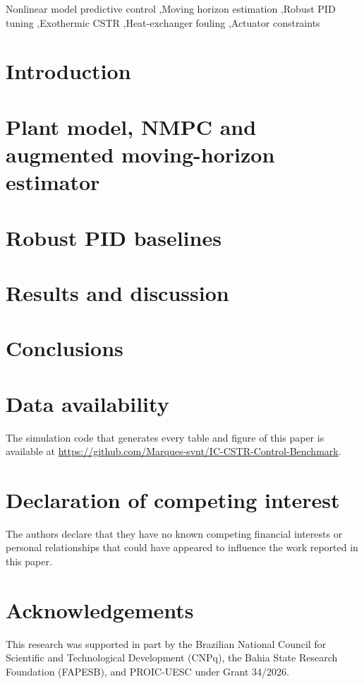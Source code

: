 \documentclass[a4paper,fleqn]{cas-dc}
\begin{document}


\begin{keywords}
Nonlinear model predictive control \sep Moving horizon estimation \sep Robust PID tuning \sep Exothermic CSTR \sep Heat-exchanger fouling \sep Actuator constraints
\end{keywords}

\maketitle

\section{Introduction}
\label{sec:introduction}


\section{Plant model, NMPC and augmented moving-horizon estimator}
\label{sec:formulation}


\section{Robust PID baselines}
\label{sec:baselines}


\section{Results and discussion}
\label{sec:results}


\section{Conclusions}
\label{sec:conclusion}


\section*{Data availability}
The simulation code that generates every table and figure of this paper is available at \url{https://github.com/Marques-svnt/IC-CSTR-Control-Benchmark}.

\section*{Declaration of competing interest}
The authors declare that they have no known competing financial interests or personal relationships that could have appeared to influence the work reported in this paper.

\section*{Acknowledgements}
This research was supported in part by the Brazilian National Council for Scientific and Technological Development (CNPq), the Bahia State Research Foundation (FAPESB), and PROIC-UESC under Grant 34/2026.



\end{document}
